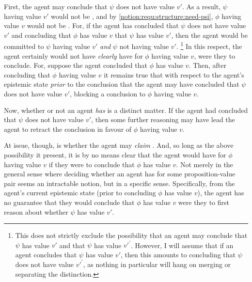 \begin{note}
  First, the agent may conclude that \(\psi\) does not have value \(v'\).
  As a result, \(\psi\) having value \(v'\) would not be \epVAd{}, and by \ref{notion:requ:structure:need-psi}, \(\phi\) having value \(v\) would not be \epVAd{}.
  For, if the agent has concluded that \(\psi\) does not have value \(v'\) and concluding that \(\phi\) has value \(v\)  that \(\psi\) has value \(v'\), then the agent would be committed to \(\psi\) having value \(v'\) \emph{and} \(\psi\) not having value \(v'\).\nolinebreak
  \footnote{
    This does not strictly exclude the possibility that an agent may conclude that \(\psi\) has value \(v'\) and that \(\psi\) has value \(v'^{'}\).
    However, I will assume that if an agent concludes that \(\psi\) has value \(v'\), then this amounts to concluding that \(\psi\) does not have value \(v'^{'}\), as nothing in particular will hang on merging or separating the distinction.
  }
  In this respect, the agent certainly would not have \emph{clearly} have \support{} for \(\phi\) having value \(v\), were they to conclude.
  For, suppose the agent concluded that \(\phi\) has value \(v\).
  Then, after concluding that \(\phi\) having value \(v\) it remains true that with respect to the agent's epistemic state \emph{prior} to the conclusion that the agent may have concluded that \(\psi\) does not have value \(v'\), blocking a conclusion to \(\phi\) having value \(v\).

  Now, whether or not an agent \emph{has} \support{} is a distinct matter.
  If the agent had concluded that \(\psi\) does not have value \(v'\), then some further reasoning may have lead the agent to retract the conclusion in favour of \(\phi\) having value \(v\).

  At issue, though, is whether the agent may \emph{claim} \support{}.
  And, so long as the above possibility it present, it is by no means clear that the agent would have \support{} for \(\phi\) having value \(v\) if they were to conclude that \(\phi\) has value \(v\).
  Not merely in the general sense where deciding whether an agent has \support{} for some proposition-value pair seems an intractable notion, but in a specific sense.
  Specifically, from the agent's current epistemic state (prior to concluding \(\phi\) has value \(v\)), the agent has no guarantee that they would conclude that \(\phi\) has value \(v\) were they to first reason about whether \(\psi\) has value \(v'\).
\end{note}

